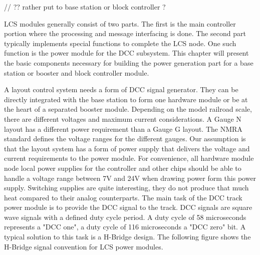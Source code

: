 
// ?? rather put to base station or block controller ?

LCS modules generally consist of two parts. The first is the main controller portion where the processing and message interfacing is done. The second part typically implements special functions to complete the LCS node. One such function is the power module for the DCC subsystem. This chapter will present the basic components necessary for building the power generation part for a base station or booster and block controller module.


A layout control system needs a form of DCC signal generator. They can be directly integrated with the base station to form one hardware module or be at the heart of a separated booster module. Depending on the model railroad scale, there are different voltages and maximum current considerations. A Gauge N layout has a different power requirement than a Gauge G layout. The NMRA standard defines the voltage ranges for the different gauges. Our assumption is that the layout system has a form of power supply that delivers the voltage and current requirements to the power module. For convenience, all hardware module node local power supplies for the controller and other chips should be able to handle a voltage range between 7V and 24V when drawing power form this power supply. Switching supplies are quite interesting, they do not produce that much heat compared to their analog counterparts. The main task of the DCC track power module is to provide the DCC signal to the track. DCC signals are square wave signals with a defined duty cycle period. A duty cycle of 58 microseconds represents a "DCC one", a duty cycle of 116 microseconds a "DCC zero" bit. A typical solution to this task is a H-Bridge design. The following figure shows the H-Bridge signal convention for LCS power modules.


